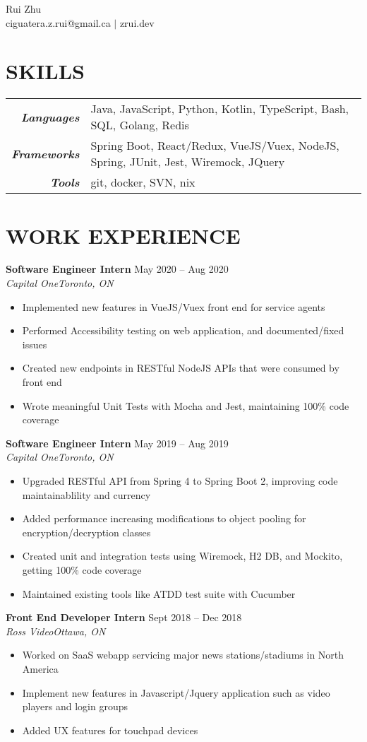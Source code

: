 \documentclass[8pt, letterpaper]{article}
\newcommand{\Header}[2]{\begin{center}
	\Huge\usefont{OT1}{lmss}{s}{n}
		#1 \\
	\small #2 \\
	\normalsize \normalfont
\end{center}}
\newcommand{\SplitEntry}[2]{\textbf{\textit{#1}} & #2\\}
\newcommand{\NewPart}[1]{\section*{\uppercase{\textbf{#1}}}}
\newcommand{\DatedEntry}[5]{\large\textbf{#1}
	\hfill #2\\\normalsize
	\textit{#3}\hfill\textit{#4}\\\vspace{0.10cm}
	#5
}
\begin{document}
\Header{Rui Zhu}{ciguatera.z.rui@gmail.ca $|$ zrui.dev}


\NewPart{Skills}{}
\begin{tabular}{r|l}
	\SplitEntry{Languages}{Java, JavaScript, Python, Kotlin, TypeScript, Bash, SQL, Golang, Redis}
	\SplitEntry{Frameworks}{Spring Boot, React/Redux, VueJS/Vuex, NodeJS, Spring, JUnit, Jest, Wiremock, JQuery}
	\SplitEntry{Tools}{git, docker, SVN, nix}
\end{tabular}


\NewPart{Work Experience}{}
\DatedEntry{Software Engineer Intern}
{May 2020 -- Aug 2020}
{Capital One}
{Toronto, ON}
{\begin{itemize}[nolistsep]
	\item Implemented new features in VueJS/Vuex front end for service agents 
	\item Performed Accessibility testing on web application, and documented/fixed issues
	\item Created new endpoints in RESTful NodeJS APIs that were consumed by front end
	\item Wrote meaningful Unit Tests with Mocha and Jest, maintaining 100\% code coverage
\end{itemize}}
\DatedEntry{Software Engineer Intern}
{May 2019 -- Aug 2019}
{Capital One}
{Toronto, ON}
{\begin{itemize}[nolistsep]
	\item Upgraded RESTful API from Spring 4 to Spring Boot 2, improving code maintainablility and currency
	\item Added performance increasing modifications to object pooling for encryption/decryption classes
	\item Created unit and integration tests using Wiremock, H2 DB, and Mockito, getting 100\% code coverage
	\item Maintained existing tools like ATDD test suite with Cucumber
\end{itemize}}
\DatedEntry{Front End Developer Intern}
{Sept 2018 -- Dec 2018}
{Ross Video}
{Ottawa, ON}
{\begin{itemize}[nolistsep]
	\item Worked on SaaS webapp servicing major news stations/stadiums in North America
	\item Implement new features in Javascript/Jquery application such as video players and login groups
	\item Added UX features for touchpad devices
\end{itemize}}
\end{document}
